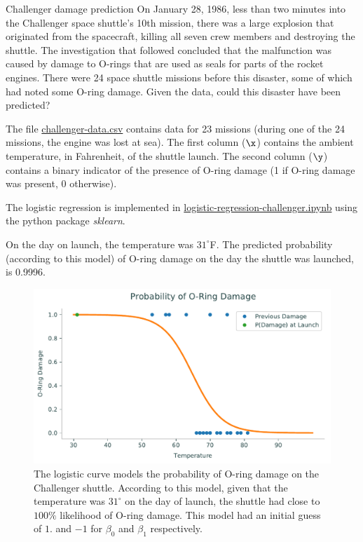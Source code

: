 \begin{example}{Challenger damage prediction}{}
On January 28, 1986, less than two minutes into the Challenger space shuttle's 10th mission, there was a large explosion that originated from the spacecraft, killing all seven crew members and destroying the shuttle.
The investigation that followed concluded that the malfunction was caused by damage to O-rings that are used as seals for parts of the rocket engines.
There were 24 space shuttle missions before this disaster, some of which had noted some O-ring damage.
Given the data, could this disaster have been predicted?

The file \href{https://github.com/open-optimization/open-optimization-or-examples/blob/master/nonlinear-programming/challenger-data.csv}{challenger-data.csv} contains data for 23 missions (during one of the 24 missions, the engine was lost at sea).
The first column ($\x$) contains the ambient temperature, in Fahrenheit, of the shuttle launch.
The second column ($\y$) contains a binary indicator of the presence of O-ring damage (1 if O-ring damage was present, 0 otherwise).

The logistic regression is implemented in \href{https://github.com/open-optimization/open-optimization-or-examples/blob/master/nonlinear-programming/logistic-regression-challenger.ipynb}{logistic-regression-challenger.ipynb} using the python package \emph{sklearn}.

On the day on launch, the temperature was $31^\circ$F.
The predicted probability (according to this model) of O-ring damage on the day the shuttle was launched, is 0.9996.  

\begin{figure}[H]
\centering
    \includegraphics[width=.7\textwidth]{foundationsAppliedMathematicsLabs/Volume2/GradientMethods/figures/logreg.pdf}
    \caption{The logistic curve models the probability of O-ring damage on the Challenger shuttle. According to this model, given that the temperature was $31^\circ$ on the day of launch, the shuttle had close to $100\%$ likelihood of O-ring damage. This model had an initial guess of $1.$ and $-1$ for $\beta_0$ and $\beta_1$ respectively.}
    \label{fig:logistic_curve}
\end{figure}
\end{example}
